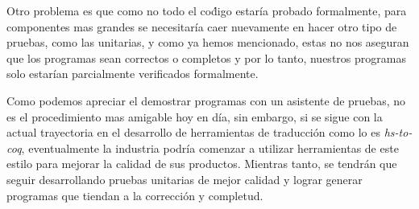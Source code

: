 Otro problema es que como no todo el co\'digo estaría probado formalmente, para componentes mas grandes se necesitaría caer 
nuevamente en hacer otro tipo de pruebas, como las unitarias, y como ya hemos mencionado, estas no nos aseguran que los 
programas sean correctos o completos y por lo tanto, nuestros programas solo estarían parcialmente verificados formalmente.

Como podemos apreciar el demostrar programas con un asistente de pruebas, no es el procedimiento mas amigable hoy en día, 
sin embargo, si se sigue con la actual trayectoria en el desarrollo de herramientas de traducci\'on como lo es \textit{hs-to-coq}, eventualmente la industria podría comenzar a utilizar herramientas de este estilo para mejorar la calidad de sus productos. Mientras tanto, se tendrán que seguir desarrollando pruebas unitarias de mejor calidad y lograr generar programas que tiendan a la correcci\'on y completud.
